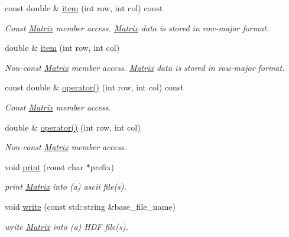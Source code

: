 \begin{DoxyCompactItemize}
const double \& \hyperlink{class_c_a_r_o_m_1_1_matrix_a2abb4e692fb8eaf2fcc6e5d7d0740e76}{item} (int row, int col) const 
\begin{DoxyCompactList}\small\item\em Const \hyperlink{class_c_a_r_o_m_1_1_matrix}{Matrix} member access. \hyperlink{class_c_a_r_o_m_1_1_matrix}{Matrix} data is stored in row-\/major format. \end{DoxyCompactList}\item 
double \& \hyperlink{class_c_a_r_o_m_1_1_matrix_a882026181013920ecd43fb3de00c8c86}{item} (int row, int col)
\begin{DoxyCompactList}\small\item\em Non-\/const \hyperlink{class_c_a_r_o_m_1_1_matrix}{Matrix} member access. \hyperlink{class_c_a_r_o_m_1_1_matrix}{Matrix} data is stored in row-\/major format. \end{DoxyCompactList}\item 
const double \& \hyperlink{class_c_a_r_o_m_1_1_matrix_a4be140c4a974a5591f286872bba00900}{operator()} (int row, int col) const 
\begin{DoxyCompactList}\small\item\em Const \hyperlink{class_c_a_r_o_m_1_1_matrix}{Matrix} member access. \end{DoxyCompactList}\item 
double \& \hyperlink{class_c_a_r_o_m_1_1_matrix_a6881e755c9a08b362157501b4b8349f9}{operator()} (int row, int col)
\begin{DoxyCompactList}\small\item\em Non-\/const \hyperlink{class_c_a_r_o_m_1_1_matrix}{Matrix} member access. \end{DoxyCompactList}\item 
void \hyperlink{class_c_a_r_o_m_1_1_matrix_a8f3c54f1b7d88acb73751cbb904f1162}{print} (const char $\ast$prefix)
\begin{DoxyCompactList}\small\item\em print \hyperlink{class_c_a_r_o_m_1_1_matrix}{Matrix} into (a) ascii file(s). \end{DoxyCompactList}\item 
void \hyperlink{class_c_a_r_o_m_1_1_matrix_ad19dad3788172b6bd5836e606ff071a3}{write} (const std\-::string \&base\-\_\-file\-\_\-name)
\begin{DoxyCompactList}\small\item\em write \hyperlink{class_c_a_r_o_m_1_1_matrix}{Matrix} into (a) H\-D\-F file(s). \end{DoxyCompactList}\item 

\end{DoxyCompactItemize}
